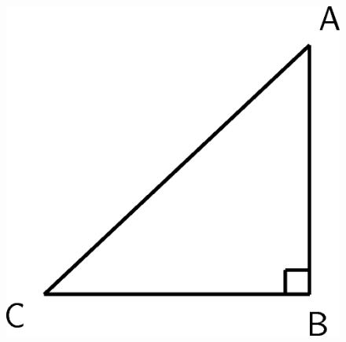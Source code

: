 \begin{enumerate}[noitemsep, label=\textbf{\arabic*}. ]
	\begin{figure}[H] %
    \begin{center}
    \label{m39408*id80226!!!underscore!!!media}\label{m39408*id80226!!!underscore!!!printimage}\includegraphics{col11306.imgs/m39408_MG10C15_005.png} %
        
      \vspace{2pt}
    \vspace{.1in}
    
    \end{center}

 \end{figure}   


\end{enumerate}

